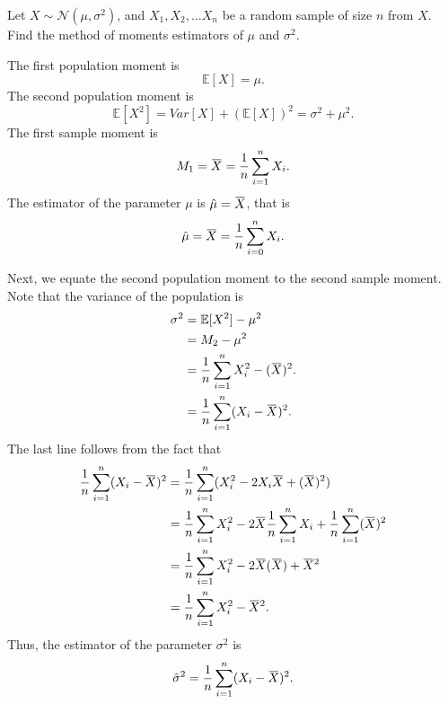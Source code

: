 \begin{example}
    Let $X \sim \mathcal{N}(\mu, \sigma^2)$, and $X_1, X_2, \ldots X_n$ be a random sample of size $n$ from $X$. 
    Find the method of moments estimators of $\mu$ and $\sigma^2$.
\end{example}
\begin{solution}
    The first population moment is 
    \[
        \mathbb{E}[X] = \mu.
    \]
    The second population moment is 
    \[
        \mathbb{E}[X^2] = Var[X] + (\mathbb{E}[X])^2 = \sigma^2 + \mu^2.
    \]
    The first sample moment is 
    \[
        M_1 = \ols{X} = \frac{1}{n}\sum_{i=1}^n X_i.
    \]
    The estimator of the parameter $\mu$ is $\hat{\mu} = \ols{X}$, that is
    \[
        \hat{\mu} = \ols{X} = \frac{1}{n}\sum_{i=0}^{n} X_i.
    \]
    
    Next, we equate the second population moment to the second sample moment. Note that the variance of the population is
    \begin{align*}
        \sigma^2 &= \mathbb{E}[X^2] - \mu^2\\
        &= M_2 - \mu^2\\
        &= \frac{1}{n}\sum_{i=1}^{n}X^2_i - (\ols{X})^2.\\
        &= \frac{1}{n} \sum_{i=1}^{n}(X_i - \ols{X})^2.
    \end{align*}
    The last line follows from the fact that
    \begin{align*}
        \frac{1}{n} \sum_{i=1}^{n}(X_i - \ols{X})^2 &= \frac{1}{n}\sum_{i=1}^{n}(X_i^2 - 2X_i\ols{X} + (\ols{X})^2)\\
        &= \frac{1}{n}\sum_{i=1}^{n}X_i^2 - 2\ols{X}\frac{1}{n}\sum_{i=1}^{n}X_i + \frac{1}{n}\sum_{i=1}^{n}(\ols{X})^2\\
        &= \frac{1}{n}\sum_{i=1}^{n}X_i^2 - 2\ols{X}(\ols{X}) + \ols{X}^2\\
        &= \frac{1}{n}\sum_{i=1}^{n}X_i^2 - \ols{X}^2.
    \end{align*}
    Thus, the estimator of the parameter $\sigma^2$ is 
    \[
        \hat{\sigma}^2 = \frac{1}{n} \sum_{i=1}^{n}(X_i - \ols{X})^2.
    \]
\end{solution}

